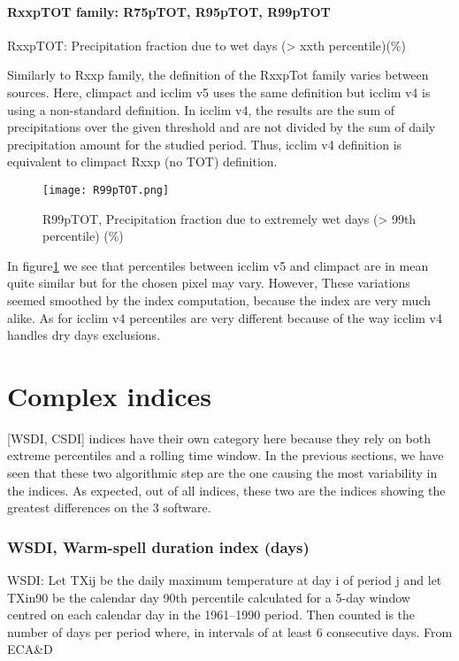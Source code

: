 \documentclass[a4paper,11pt]{article}
\begin{document}
\subsection{RxxpTOT family: R75pTOT, R95pTOT, R99pTOT}
    RxxpTOT: Precipitation fraction due to wet days (> xxth percentile)(\%)

    Similarly to Rxxp family, the definition of the RxxpTot family varies between sources. Here, climpact and icclim v5 uses the same definition but icclim v4 is using a non-standard definition. In icclim v4, the results are the sum of precipitations over the given threshold and are not divided by the sum of daily precipitation amount for the studied period. Thus, icclim v4 definition is equivalent to climpact Rxxp (no TOT) definition.

    \begin{figure}
        \centering
        \texttt{[image: R99pTOT.png]}
        \caption{R99pTOT, Precipitation fraction due to extremely wet days (> 99th percentile) (\%)}
        \label{figure/r99ptot}
    \end{figure}

    In figure\ref{figure/r99ptot} we see that percentiles between icclim v5 and climpact are in mean quite similar but for the chosen pixel may vary.
    However, These variations seemed smoothed by the index computation, because the index are very much alike.
    As for icclim v4 percentiles are very different because of the way icclim v4 handles dry days exclusions.  


\part{Complex indices}
    [WSDI, CSDI] indices have their own category here because they rely on both extreme percentiles and a rolling time window.
    In the previous sections, we have seen that these two algorithmic step are the one causing the most variability in the indices.
    As expected, out of all indices, these two are the indices showing the greatest differences on the 3 software.

\section{WSDI, Warm-spell duration index (days)}
    WSDI: Let TXij be the daily maximum temperature at day i of period j and let
    TXin90 be the calendar day 90th percentile calculated for a 5-day window
    centred on each calendar day in the 1961–1990 period. Then counted is the
    number of days per period where, in intervals of at least 6 consecutive days. From ECA\&D\cite{doc/ecad_old}
\end{document}
